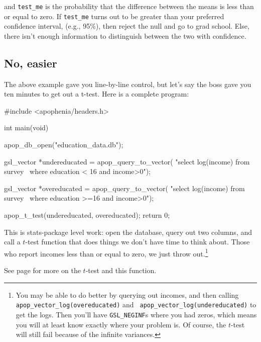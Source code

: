and {\tt test\_me} is the probability that the difference between the
means is less than or equal to zero. If {\tt test\_me} turns out to be greater
than your preferred confidence interval, (e.g., 95\%), then reject the
null and go to grad school. Else, there isn't enough information to
distinguish between the two with confidence.

\subsection{No, easier} The above example gave you line-by-line
control, but let's say the boss gave you ten minutes to get out a
t-test. Here is a complete program:

#include <apophenia/headers.h>

int main(void){
    apop_db_open("education_data.db");

    gsl_vector	*undereducated = apop_query_to_vector(
      "select log(income) from survey \
      where education < 16 and income>0");

    gsl_vector	*overeducated = apop_query_to_vector(
      "select log(income) from survey \
      where education >=16 and income>0");

    apop_t_test(undereducated, overeducated);
    return 0;
}

This is stats-package level work: open the database, query out two
columns, and call a $t$-test function that does things
we don't have time to think about. Those who report incomes less than or
equal to zero, we just throw out.\footnote{You may be able to do better
by querying out incomes, and then calling
    {\tt apop\_vector\_log(overeducated)} and {\tt
    apop\_vector\_log(undereducated)} to get the logs. Then you'll have
    {\tt GSL\_NEGINF}s where you had zeros, which means you will at least
    know exactly where your problem is. Of course, the $t$-test will
    still fail because of the infinite variances.}

See page \pageref{ttest} for more on the $t$-test and this function.

